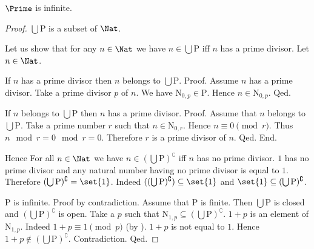 \documentclass{article}
\newcommand{\N}{\mathrm{N}}
\newcommand{\Ps}{\mathrm{P}}
\begin{document}
\begin{forthel}
    \begin{theorem}[title=Furstenberg]
      $\Prime$ is infinite.
    \end{theorem}
    \begin{proof}
      $\bigcup \Ps$ is a subset of $\Nat$.

      Let us show that for any $n \in \Nat$ we have $n \in \bigcup \Ps$ iff $n$
      has a prime divisor.
        Let $n \in \Nat$.

        If $n$ has a prime divisor then $n$ belongs to $\bigcup \Ps$. \newline
        Proof.
          Assume $n$ has a prime divisor.
          Take a prime divisor $p$ of $n$.
          We have $\N_{0, p} \in \Ps$.
          Hence $n \in \N_{0, p}$.
        Qed.

        If $n$ belongs to $\bigcup \Ps$ then $n$ has a prime divisor. \newline
        Proof.
          Assume that $n$ belongs to $\bigcup \Ps$.
          Take a prime number $r$ such that $n \in \N_{0, r}$.
          Hence $n \equiv 0 \pmod{r}$.
          Thus $n \mod r = 0 \mod r = 0$.
          Therefore $r$ is a prime divisor of $n$.
        Qed.
      End.

      Hence For all $n \in \Nat$ we have $n \in (\bigcup \Ps)^\complement$ iff
      $n$ has no prime divisor.
      $1$ has no prime divisor and any natural number having no prime
      divisor is equal to $1$.
      Therefore $(\bigcup \Ps)^\complement = \set{1}$.
      Indeed $((\bigcup \Ps)^\complement) \subseteq \set{1}$ and $\set{1}
      \subseteq (\bigcup \Ps)^\complement$. %

      $\Ps$ is infinite. \newline
      Proof by contradiction.
        Assume that $\Ps$ is finite.
        Then $\bigcup \Ps$ is closed and $(\bigcup \Ps)^\complement$ is open.
        Take a $p$ such that $\N_{1, p} \subseteq (\bigcup \Ps)^\complement$.
        $1 + p$ is an element of $\N_{1, p}$.
        Indeed $1 + p \equiv 1 \pmod{p}$
        (by ).
        $1 + p$ is not equal to $1$.
        Hence $1 + p \notin (\bigcup \Ps)^\complement$.
        Contradiction.
      Qed.
    \end{proof}
  \end{forthel}

  \printbibliography
\end{document}
